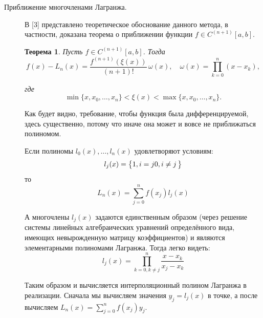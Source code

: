 \documentclass{article}
\newtheorem{theorem}{Теорема}
\begin{document}
\begin{description}
    \item[Приближение многочленами Лагранжа.]

    В [3] представлено теоретическое обоснование данного метода, в частности, доказана теорема о приближении функции \(f \in C^{(n+1)}[a,b]\).

    \begin{theorem}
        Пусть \(f \in C^{(n+1)}[a,b]\). Тогда
        \begin{equation}
            f(x) - L_n(x) = \frac{f^{(n+1)}(\xi(x))}{(n+1)!} \, \omega(x), \quad \omega(x) = \prod_{k=0}^{n} (x - x_k),
            \label{eq:lagrange_error}
        \end{equation}

        где
        \begin{equation}
            \min\{x, x_0, \ldots, x_n\} < \xi(x) < \max\{x, x_0, \ldots, x_n\}.
            \label{eq:placeholder}
        \end{equation}
    \end{theorem}

    Как будет видно, требование, чтобы функция была дифференцируемой, здесь существенно, потому что иначе она может и вовсе не приближаться полиномом.
    
    Если полиномы \(l_0(x), \dots, l_n(x)\) удовлетворяют условиям:
    \begin{equation}
    	l_j(x) = \left\{
    			\begin{array}{@{}l@{\thinspace}l}
    				1, i = j
    				0, i \neq j
    			\end{array}
    	\right\}
    \end{equation}
    то
    \begin{equation}
    	L_n(x) = \sum_{j=0}^{n}f(x_j)l_j(x)
    \end{equation}
    
    А многочлены \(l_j(x)\) задаются единственным образом (через решение системы линейных алгебраических уравнений определённого вида, имеющих невырожденную матрицу коэффициентов) и являются элементарными полиномами Лагранжа. Тогда легко видеть:
    \begin{equation}
    		l_j(x) = \prod_{k=0, k \neq j}^{n}\frac{x - x_k}{x_j - x_k}
	\end{equation}
	
	Таким образом и вычисляется интерполяционный полином Лагранжа в реализации. Сначала мы вычисляем значения \(y_j = l_j(x)\) в точке, а после вычисляем \(L_n(x) = \sum_{j=0}^{n}f(x_j)y_j\).


\end{description}
\end{document}
